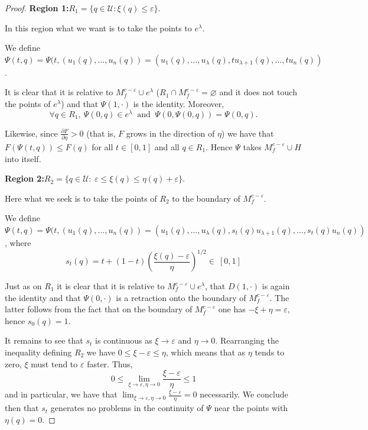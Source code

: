 \begin{proof}
    \textbf{Region 1:}\quad $R_1=\{q\in\mathcal{U}:\xi(q)\le \varepsilon\}$.

    In this region what we want is to take the points to $e^{\lambda}$.

    We define $\Psi(t,q)=\Psi(t,(u_1(q),\dots,u_n(q))=(u_1(q),\dots,u_{\lambda}(q),tu_{\lambda+1}(q),\dots,tu_n(q))$.
    \bigskip

    It is clear that it is relative to $M^{c-\varepsilon}_f\cup e^{\lambda}$ ($R_1\cap M^{c-\varepsilon}_f=\varnothing$ and it does not touch the points of $e^{\lambda}$) and that $\Psi(1,\cdot)$ is the identity. Moreover,
    \begin{equation*}
        \forall q\in R_1, ~\Psi(0, q)\in e^{\lambda} ~\text{ and }~ \Psi(0,\Psi(0,q))=\Psi(0,q).
    \end{equation*}

    Likewise, since $\frac{\partial F}{\partial \eta}>0$ (that is, $F$ grows in the direction of $\eta$) we have that $F(\Psi(t,q))\le F(q)$ for all $t\in [0,1]$ and all $q\in R_1$. Hence $\Psi$ takes $M_f^{c-\varepsilon}\cup H$ into itself.
    \bigskip

    \textbf{Region 2:}\quad $R_2=\{q\in \mathcal{U}:~ \varepsilon\le \xi(q)\le \eta(q)+\varepsilon\}$.


    Here what we seek is to take the points of $R_2$ to the boundary of $M_f^{c-\varepsilon}$.

    We define $\Psi(t,q)=\Psi(t,(u_1(q),\dots,u_n(q))=(u_1(q),\dots,u_{\lambda}(q),s_t(q) u_{\lambda+1}(q),\dots,s_t(q) u_n(q))$, where
    \begin{equation*}
        s_t(q)=t + (1-t)\left(\frac{\xi(q)-\varepsilon}{\eta}\right)^{1/2} \in ~[0,1]
    \end{equation*}

    Just as on $R_1$ it is clear that it is relative to $M_f^{c-\varepsilon}\cup e^{\lambda}$, that $D(1,\cdot)$ is again the identity and that $\Psi(0,\cdot)$ is a retraction onto the boundary of $M_f^{c-\varepsilon}$. The latter follows from the fact that on the boundary of $M_f^{c-\varepsilon}$ one has $-\xi +\eta = \varepsilon$, hence $s_0(q)=1$. %

    It remains to see that $s_t$ is continuous as $\xi \to \varepsilon$ and $\eta \to 0$. Rearranging the inequality defining $R_2$ we have $0\le\xi-\varepsilon\le\eta$, which means that as $\eta$ tends to zero, $\xi$ must tend to $\varepsilon$ faster. Thus,
    \begin{equation*}
        0\le \lim_{\xi \to \varepsilon, \eta\to 0} \frac{\xi - \varepsilon}{\eta} \le 1
    \end{equation*}
    and in particular, we have that $\lim_{\xi \to \varepsilon, \eta\to 0} \frac{\xi - \varepsilon}{\eta}=0$ necessarily. We conclude then that $s_t$ generates no problems in the continuity of $\Psi$ near the points with $\eta(q)=0$. %
    \bigskip


\end{proof}
